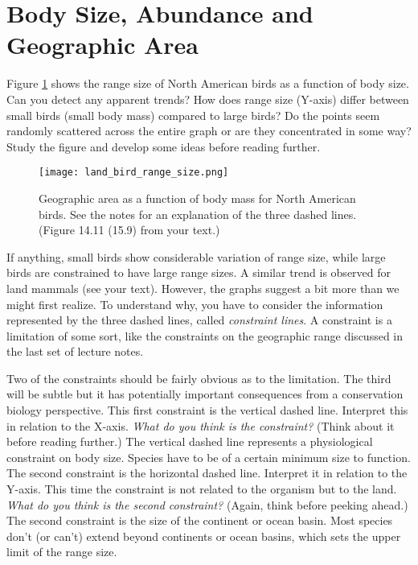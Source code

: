 \documentclass[11pt, hidelinks]{article}
\begin{document}
\section{Body Size, Abundance and Geographic Area}

Figure \ref{areabodysize}  shows the range size of North American birds as a function of body size.  Can you detect any apparent trends? How does range size (Y-axis) differ between small birds (small body mass) compared to large birds? Do the points seem randomly scattered across the entire graph or are they concentrated in some way?  Study the figure and develop some ideas before reading further.

\begin{figure}[tb]
	\centering
		\texttt{[image: land\_bird\_range\_size.png]}
		\caption{Geographic area as a function of body mass for North American birds.  See the notes for an explanation of the three dashed lines. (Figure 14.11 (15.9) from your text.)\label{areabodysize}}
\end{figure}

If anything, small birds show considerable variation of range size, while large birds are constrained to have large range sizes.  A similar trend is observed for land mammals (see your text).  However, the graphs suggest a bit more than we might first realize.  To understand why, you have to consider the information represented by the three dashed lines, called \emph{constraint lines}.   A constraint is a limitation of some sort, like the constraints on the geographic range discussed in the last set of lecture notes.
 
Two of the constraints should be fairly obvious as to the limitation.  The third will be subtle but it has potentially important consequences from a conservation biology perspective.  This first constraint is the vertical dashed line.  Interpret this in relation to the X-axis. \emph{What do you think is the constraint?} (Think about it before reading further.) The vertical dashed line represents a physiological constraint on body size.  Species have to be of a certain minimum size to function. The second constraint is the horizontal dashed line. Interpret it in relation to the Y-axis. This time the constraint is not related to the organism but to the land.  \emph{What do you think is the second constraint?} (Again, think before peeking ahead.)  The second constraint is the size of the continent or ocean basin.  Most species don't (or can't) extend beyond continents or ocean basins, which sets the upper limit of the range size.
\end{document}
